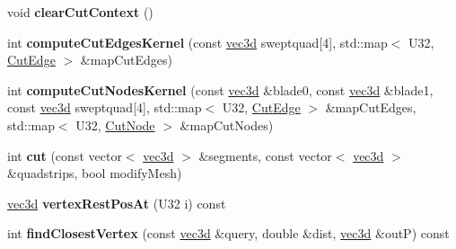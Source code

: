 \begin{DoxyCompactItemize}
\item 
\hypertarget{classps_1_1elastic_1_1CuttableMesh_a62df92014b8773a00312cc7728bf7da2}{}void {\bfseries clear\+Cut\+Context} ()\label{classps_1_1elastic_1_1CuttableMesh_a62df92014b8773a00312cc7728bf7da2}

\item 
\hypertarget{classps_1_1elastic_1_1CuttableMesh_a399904005742c9dfdff7bb434ab9bf76}{}int {\bfseries compute\+Cut\+Edges\+Kernel} (const \hyperlink{classps_1_1base_1_1Vec3}{vec3d} sweptquad\mbox{[}4\mbox{]}, std\+::map$<$ U32, \hyperlink{classps_1_1elastic_1_1CuttableMesh_1_1CutEdge}{Cut\+Edge} $>$ \&map\+Cut\+Edges)\label{classps_1_1elastic_1_1CuttableMesh_a399904005742c9dfdff7bb434ab9bf76}

\item 
\hypertarget{classps_1_1elastic_1_1CuttableMesh_add23a02582a31568808e6b652f542213}{}int {\bfseries compute\+Cut\+Nodes\+Kernel} (const \hyperlink{classps_1_1base_1_1Vec3}{vec3d} \&blade0, const \hyperlink{classps_1_1base_1_1Vec3}{vec3d} \&blade1, const \hyperlink{classps_1_1base_1_1Vec3}{vec3d} sweptquad\mbox{[}4\mbox{]}, std\+::map$<$ U32, \hyperlink{classps_1_1elastic_1_1CuttableMesh_1_1CutEdge}{Cut\+Edge} $>$ \&map\+Cut\+Edges, std\+::map$<$ U32, \hyperlink{structps_1_1elastic_1_1CuttableMesh_1_1CutNode}{Cut\+Node} $>$ \&map\+Cut\+Nodes)\label{classps_1_1elastic_1_1CuttableMesh_add23a02582a31568808e6b652f542213}

\item 
\hypertarget{classps_1_1elastic_1_1CuttableMesh_a4d77e2e597d0a625f999d15a269158c3}{}int {\bfseries cut} (const vector$<$ \hyperlink{classps_1_1base_1_1Vec3}{vec3d} $>$ \&segments, const vector$<$ \hyperlink{classps_1_1base_1_1Vec3}{vec3d} $>$ \&quadstrips, bool modify\+Mesh)\label{classps_1_1elastic_1_1CuttableMesh_a4d77e2e597d0a625f999d15a269158c3}

\item 
\hypertarget{classps_1_1elastic_1_1CuttableMesh_a8a8b7a44f8248de22a90deb4c8960962}{}\hyperlink{classps_1_1base_1_1Vec3}{vec3d} {\bfseries vertex\+Rest\+Pos\+At} (U32 i) const \label{classps_1_1elastic_1_1CuttableMesh_a8a8b7a44f8248de22a90deb4c8960962}

\item 
\hypertarget{classps_1_1elastic_1_1CuttableMesh_a684f7b36a4e5fb9846099fd8995caa38}{}int {\bfseries find\+Closest\+Vertex} (const \hyperlink{classps_1_1base_1_1Vec3}{vec3d} \&query, double \&dist, \hyperlink{classps_1_1base_1_1Vec3}{vec3d} \&out\+P) const \label{classps_1_1elastic_1_1CuttableMesh_a684f7b36a4e5fb9846099fd8995caa38}


\end{DoxyCompactItemize}
